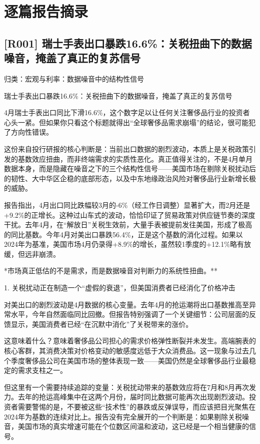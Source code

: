 \documentclass[11pt]{ctexart}
\begin{document}
\section{逐篇报告摘录}
\subsection{[R001] 瑞士手表出口暴跌16.6\%：关税扭曲下的数据噪音，掩盖了真正的复苏信号}
{\small\color{refgray}归类：宏观与利率：数据噪音中的结构性信号}

瑞士手表出口暴跌16.6\%：关税扭曲下的数据噪音，掩盖了真正的复苏信号

4月瑞士手表出口同比下滑16.6\%，这个数字足以让任何关注奢侈品行业的投资者心头一紧。但如果你只看这个标题就得出“全球奢侈品需求崩塌”的结论，很可能犯了方向性错误。

这份来自投行研报的核心判断是：当前出口数据的剧烈波动，本质上是关税政策引发的基数效应扭曲，而非终端需求的实质性恶化。真正值得关注的，不是4月单月数据本身，而是隐藏在噪音之下的三个结构性信号——美国市场在剔除关税扰动后的韧性、大中华区企稳的底部形态，以及中东地缘政治风险对奢侈品行业新增长极的威胁。

报告指出，4月出口同比跌幅较3月的-6\%（经工作日调整）显著扩大，而2月还是+9.2\%的正增长。这种过山车式的波动，恰恰印证了贸易政策对供应链节奏的深度干扰。去年4月，在“解放日”关税生效前，大量手表被提前发往美国，形成了极高的同比基数。今年4月对美出口暴跌56.4\%，正是这个基数的消化过程。如果以2024年为基准，美国市场4月仍录得+8.9\%的增长，虽然较1季度的+12.1\%略有放缓，但远非崩溃。

*市场真正低估的不是需求，而是数据噪音对判断力的系统性扭曲。**

1. 关税扰动正在制造一个“虚假的衰退”，但美国消费者已经消化了价格冲击

对美出口的剧烈波动是4月数据的核心变量。去年4月的抢运潮将出口基数推高至异常水平，今年自然面临同比回撤。但报告特别强调了一个关键细节：公司层面的反馈显示，美国消费者已经“在沉默中消化”了关税带来的涨价。

这意味着什么？意味着奢侈品公司担心的需求价格弹性断裂并未发生。高端腕表的核心客群，其消费决策对价格变动的敏感度远低于大众消费品。这一现象与过去几个季度奢侈品公司在美国市场的整体表现一致——美国仍然是全球奢侈品行业最稳定的需求支柱之一。

但这里有一个需要持续追踪的变量：关税扰动带来的基数效应将在7月和8月再次发力。去年的抢运高峰集中在这两个月份，届时同比数据可能再次出现剧烈波动。投资者需要警惕的是，不要被这些“技术性”的暴跌或反弹误导，而应该把目光聚焦在2024年为基数的连续对比上。报告没有完全展开的一个判断是：如果剔除关税噪音，美国市场的真实增速可能在个位数区间温和波动，这已经是一个相当健康的信号。
\end{document}

